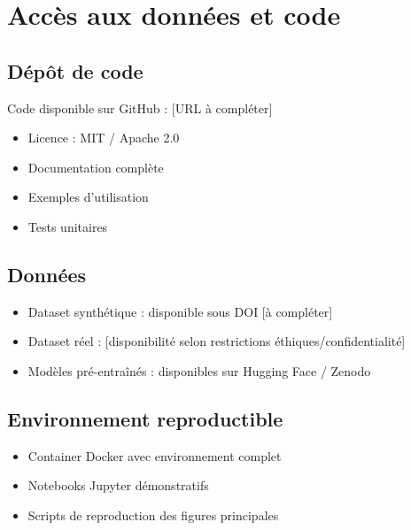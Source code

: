 \section{Accès aux données et code}

\subsection{Dépôt de code}
Code disponible sur GitHub : [URL à compléter]
\begin{itemize}
    \item Licence : MIT / Apache 2.0
    \item Documentation complète
    \item Exemples d'utilisation
    \item Tests unitaires
\end{itemize}

\subsection{Données}
\begin{itemize}
    \item Dataset synthétique : disponible sous DOI [à compléter]
    \item Dataset réel : [disponibilité selon restrictions éthiques/confidentialité]
    \item Modèles pré-entraînés : disponibles sur Hugging Face / Zenodo
\end{itemize}

\subsection{Environnement reproductible}
\begin{itemize}
    \item Container Docker avec environnement complet
    \item Notebooks Jupyter démonstratifs
    \item Scripts de reproduction des figures principales
\end{itemize}
